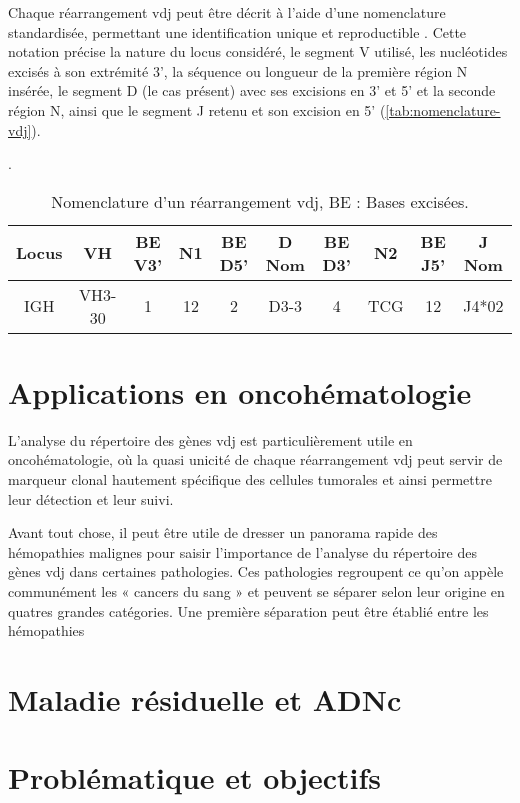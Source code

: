 

Chaque réarrangement \gls{vdj} peut être décrit à l'aide d'une nomenclature standardisée, 
permettant une identification unique et reproductible \cite{laneIMGTONTOLOGYIMGTLIGMotif2010,lefrancIMGT30Years2019}. 
Cette notation précise la nature du locus considéré, le segment V utilisé, les nucléotides excisés à son extrémité 3', 
la séquence ou longueur de la première région N insérée, le segment D (le cas présent) avec ses excisions en 3' et 5' 
et la seconde région N, ainsi que le segment J retenu et son excision en 5' (\autoref{tab:nomenclature-vdj}).

\begin{table}[H]
    \centering
    \caption{Nomenclature d’un réarrangement \gls{vdj}, BE : Bases excisées.}.
    \label{tab:nomenclature-vdj}
    \begin{tabular}{c c c c c c c c c c}
        \toprule
        \textbf{Locus} & \textbf{VH} & \textbf{BE V3'} & \textbf{N1} & \textbf{BE D5'} & 
        \textbf{D Nom} & \textbf{BE D3'} & \textbf{N2} & \textbf{BE J5'} & \textbf{J Nom} \\        
        \midrule IGH & VH3-30 & 1 & 12 & 2 & D3-3 & 4 & TCG & 12 & J4*02 \\
        \bottomrule
    \end{tabular}
\end{table}


\section{Applications en oncohématologie}

L'analyse du répertoire des gènes \gls{vdj} est particulièrement utile en oncohématologie, 
où la quasi unicité de chaque réarrangement \gls{vdj} peut servir de marqueur clonal hautement 
spécifique des cellules tumorales et ainsi permettre leur détection et leur suivi. 

Avant tout chose, il peut être utile de dresser un panorama rapide des hémopathies malignes 
pour saisir l'importance de l'analyse du répertoire des gènes \gls{vdj} dans certaines pathologies.
Ces pathologies regroupent ce qu'on appèle communément les « cancers du sang » et peuvent se séparer selon
leur origine en quatres grandes catégories. Une première séparation peut être établié entre les hémopathies

\section{Maladie résiduelle et ADNc}

\section{Problématique et objectifs}
